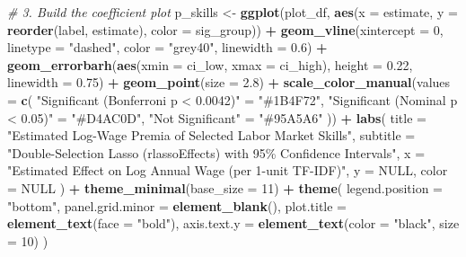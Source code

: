 \documentclass[
]{article}
\newenvironment{Shaded}{\begin{snugshade}}{\end{snugshade}}
\newcommand{\AttributeTok}[1]{\textcolor[rgb]{0.13,0.29,0.53}{#1}}
\newcommand{\CommentTok}[1]{\textcolor[rgb]{0.56,0.35,0.01}{\textit{#1}}}
\newcommand{\ConstantTok}[1]{\textcolor[rgb]{0.56,0.35,0.01}{#1}}
\newcommand{\DecValTok}[1]{\textcolor[rgb]{0.00,0.00,0.81}{#1}}
\newcommand{\FloatTok}[1]{\textcolor[rgb]{0.00,0.00,0.81}{#1}}
\newcommand{\FunctionTok}[1]{\textcolor[rgb]{0.13,0.29,0.53}{\textbf{#1}}}
\newcommand{\NormalTok}[1]{#1}
\newcommand{\OtherTok}[1]{\textcolor[rgb]{0.56,0.35,0.01}{#1}}
\newcommand{\SpecialCharTok}[1]{\textcolor[rgb]{0.81,0.36,0.00}{\textbf{#1}}}
\newcommand{\StringTok}[1]{\textcolor[rgb]{0.31,0.60,0.02}{#1}}
\begin{document}
\begin{Shaded}
\begin{Highlighting}[]
\CommentTok{\# 3. Build the coefficient plot}
\NormalTok{p\_skills }\OtherTok{\textless{}{-}} \FunctionTok{ggplot}\NormalTok{(plot\_df, }\FunctionTok{aes}\NormalTok{(}\AttributeTok{x =}\NormalTok{ estimate, }\AttributeTok{y =} \FunctionTok{reorder}\NormalTok{(label, estimate), }\AttributeTok{color =}\NormalTok{ sig\_group)) }\SpecialCharTok{+}
  \FunctionTok{geom\_vline}\NormalTok{(}\AttributeTok{xintercept =} \DecValTok{0}\NormalTok{, }\AttributeTok{linetype =} \StringTok{"dashed"}\NormalTok{, }\AttributeTok{color =} \StringTok{"grey40"}\NormalTok{, }\AttributeTok{linewidth =} \FloatTok{0.6}\NormalTok{) }\SpecialCharTok{+}
  \FunctionTok{geom\_errorbarh}\NormalTok{(}\FunctionTok{aes}\NormalTok{(}\AttributeTok{xmin =}\NormalTok{ ci\_low, }\AttributeTok{xmax =}\NormalTok{ ci\_high), }\AttributeTok{height =} \FloatTok{0.22}\NormalTok{, }\AttributeTok{linewidth =} \FloatTok{0.75}\NormalTok{) }\SpecialCharTok{+}
  \FunctionTok{geom\_point}\NormalTok{(}\AttributeTok{size =} \FloatTok{2.8}\NormalTok{) }\SpecialCharTok{+}
  \FunctionTok{scale\_color\_manual}\NormalTok{(}\AttributeTok{values =} \FunctionTok{c}\NormalTok{(}
    \StringTok{"Significant (Bonferroni p \textless{} 0.0042)"} \OtherTok{=} \StringTok{"\#1B4F72"}\NormalTok{,}
    \StringTok{"Significant (Nominal p \textless{} 0.05)"}      \OtherTok{=} \StringTok{"\#D4AC0D"}\NormalTok{,}
    \StringTok{"Not Significant"}                     \OtherTok{=} \StringTok{"\#95A5A6"}
\NormalTok{  )) }\SpecialCharTok{+}
  \FunctionTok{labs}\NormalTok{(}
    \AttributeTok{title    =} \StringTok{"Estimated Log{-}Wage Premia of Selected Labor Market Skills"}\NormalTok{,}
    \AttributeTok{subtitle =} \StringTok{"Double{-}Selection Lasso (rlassoEffects) with 95\% Confidence Intervals"}\NormalTok{,}
    \AttributeTok{x        =} \StringTok{"Estimated Effect on Log Annual Wage (per 1{-}unit TF{-}IDF)"}\NormalTok{,}
    \AttributeTok{y        =} \ConstantTok{NULL}\NormalTok{,}
    \AttributeTok{color    =} \ConstantTok{NULL}
\NormalTok{  ) }\SpecialCharTok{+}
  \FunctionTok{theme\_minimal}\NormalTok{(}\AttributeTok{base\_size =} \DecValTok{11}\NormalTok{) }\SpecialCharTok{+}
  \FunctionTok{theme}\NormalTok{(}
    \AttributeTok{legend.position   =} \StringTok{"bottom"}\NormalTok{,}
    \AttributeTok{panel.grid.minor  =} \FunctionTok{element\_blank}\NormalTok{(),}
    \AttributeTok{plot.title        =} \FunctionTok{element\_text}\NormalTok{(}\AttributeTok{face =} \StringTok{"bold"}\NormalTok{),}
    \AttributeTok{axis.text.y       =} \FunctionTok{element\_text}\NormalTok{(}\AttributeTok{color =} \StringTok{"black"}\NormalTok{, }\AttributeTok{size =} \DecValTok{10}\NormalTok{)}
\NormalTok{  )}
\end{Highlighting}
\end{Shaded}
\end{document}
